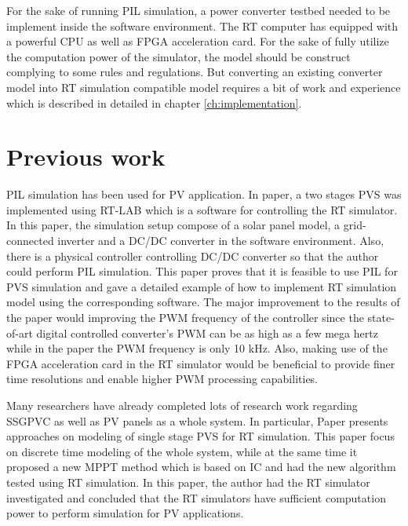 For the sake of running \gls{PIL} simulation, a power converter testbed needed to be implement inside the software environment. The \gls{RT} computer has equipped with a powerful \gls{CPU} as well as \gls{FPGA} acceleration card. For the sake of fully utilize the computation power of the simulator, the model should be construct complying to some rules and regulations. But converting an existing converter model into \gls{RT} simulation compatible model requires a bit of work and experience which is described in detailed in chapter \ref{ch:implementation}.

\section{Previous work}
\gls{PIL} simulation has been used for \gls{PV} application. In paper,\cite{RN11} a two stages \gls{PVS} was implemented using RT-LAB which is a software for controlling the \gls{RT} simulator. In this paper, the simulation setup compose of a solar panel model, a grid-connected inverter and a DC/DC converter in the software environment. Also, there is a physical controller controlling DC/DC converter so that the author could perform \gls{PIL} simulation. This paper proves that it is feasible to use \gls{PIL} for \gls{PVS} simulation and gave a detailed example of how to implement \gls{RT} simulation model using the corresponding software. The major improvement to the results of the paper would improving the \gls{PWM} frequency of the controller since the state-of-art digital controlled converter's \gls{PWM} can be as high as a few mega hertz while in the paper the \gls{PWM} frequency is only 10 kHz. Also, making use of the \gls{FPGA} acceleration card in the \gls{RT} simulator would be beneficial to provide finer time resolutions and enable higher \gls{PWM} processing capabilities.

Many researchers have already completed lots of research work regarding \gls{SSGPVC} as well as PV panels as a whole system. In particular, Paper \cite{RN3} presents approaches on modeling of single stage \gls{PVS} for \gls{RT} simulation. This paper focus on discrete time modeling of the whole system, while at the same time it proposed a new MPPT method which is based on \gls{IC} and had the new algorithm tested using \gls{RT} simulation. In this paper, the author had the \gls{RT} simulator investigated and concluded that the \gls{RT} simulators have sufficient computation power to perform simulation for PV applications. 


